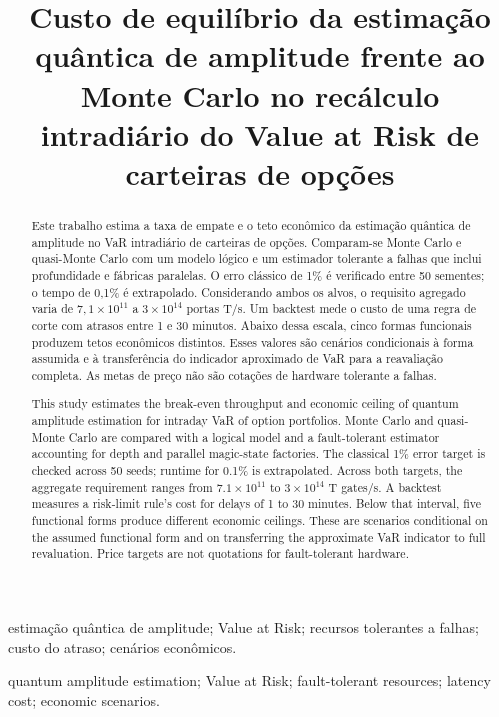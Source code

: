 \documentclass[conference,a4paper]{IEEEtran}
\title{Custo de equilíbrio da estimação quântica de amplitude frente ao Monte Carlo no recálculo intradiário do Value at Risk de carteiras de opções}
\author{\IEEEauthorblockN{Arthur Bretas, Lucas Magalhães e Henrique Botti}
\IEEEauthorblockA{Inteli, Instituto de Tecnologia e Liderança\\
Orientação: Erinaldo Fonseca e Bryan Ferreira}}
\begin{document}
\maketitle
\renewcommand{\abstractname}{Resumo}
\begin{abstract}
Este trabalho estima a taxa de empate e o teto econômico da estimação quântica de amplitude no VaR intradiário de carteiras de opções. Comparam-se Monte Carlo e quasi-Monte Carlo com um modelo lógico e um estimador tolerante a falhas que inclui profundidade e fábricas paralelas. O erro clássico de 1\% é verificado entre 50 sementes; o tempo de 0,1\% é extrapolado. Considerando ambos os alvos, o requisito agregado varia de \(7{,}1\times10^{11}\) a \(3\times10^{14}\) portas T/s. Um backtest mede o custo de uma regra de corte com atrasos entre 1 e 30 minutos. Abaixo dessa escala, cinco formas funcionais produzem tetos econômicos distintos. Esses valores são cenários condicionais à forma assumida e à transferência do indicador aproximado de VaR para a reavaliação completa. As metas de preço não são cotações de hardware tolerante a falhas.
\end{abstract}
\begin{IEEEkeywords}
estimação quântica de amplitude; Value at Risk; recursos tolerantes a falhas; custo do atraso; cenários econômicos.
\end{IEEEkeywords}
\renewcommand{\abstractname}{Abstract}
\begin{abstract}
This study estimates the break-even throughput and economic ceiling of quantum amplitude estimation for intraday VaR of option portfolios. Monte Carlo and quasi-Monte Carlo are compared with a logical model and a fault-tolerant estimator accounting for depth and parallel magic-state factories. The classical 1\% error target is checked across 50 seeds; runtime for 0.1\% is extrapolated. Across both targets, the aggregate requirement ranges from \(7.1\times10^{11}\) to \(3\times10^{14}\) T gates/s. A backtest measures a risk-limit rule's cost for delays of 1 to 30 minutes. Below that interval, five functional forms produce different economic ceilings. These are scenarios conditional on the assumed functional form and on transferring the approximate VaR indicator to full revaluation. Price targets are not quotations for fault-tolerant hardware.
\end{abstract}
\begin{IEEEkeywords}
quantum amplitude estimation; Value at Risk; fault-tolerant resources; latency cost; economic scenarios.
\end{IEEEkeywords}
\end{document}
